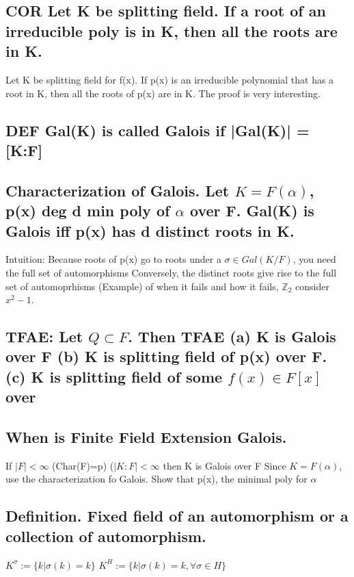 \documentclass[11pt]{article}
\begin{document}
\subsection{\textbf{COR} Let K be splitting field. If a root of an irreducible poly is in K, then all the roots are in K.}
\label{sec:org5afed12}
Let K be splitting field for f(x). If p(x) is an irreducible polynomial that has a root in K, then all the roots of p(x) are in K.
The proof is very interesting. 

\subsection{\textbf{DEF} Gal(K\F) is called \textbf{Galois} if |Gal(K\F)| = [K:F]}
\label{sec:org8d32724}
\subsection{\textbf{Characterization of Galois.} Let \(K=F(\alpha)\), p(x) deg d min poly of \(\alpha\) over F. Gal(K\F) is Galois iff p(x) has d distinct roots in K.}
\label{sec:org3bbb12d}
Intuition: Because roots of p(x) go to roots under a \(\sigma \in Gal(K/F)\), you need the full set of automorphisms
Conversely, the distinct roots give rise to the full set of automoprhisms
(Example) of when it fails and how it fails, \(\mathbb{Z}_2\) consider \(x^2-1\).

\subsection{TFAE: Let \(Q \subset F\). Then TFAE (a) K is Galois over F (b) K is splitting field of p(x) over F. (c) K is splitting field of some \(f(x)\in F[x]\) over}
\label{sec:org99768f8}
\subsection{\textbf{When is Finite Field Extension Galois.}}
\label{sec:org4f87351}
If \(|F|<\infty\) (Char(F)=p) (\(|K:F| < \infty\) then K is Galois over F 
Since \(K=F(\alpha)\), use the characterization fo Galois. Show that p(x), the minimal poly for \(\alpha\) 

\subsection{\textbf{Definition.} Fixed field of an automorphism or a collection of automorphism.}
\label{sec:org0b81004}
\(K^\sigma := \{k | \sigma(k)=k\}\) \(K^H := \{k | \sigma(k)=k, \forall \sigma \in H \}\)
\end{document}
